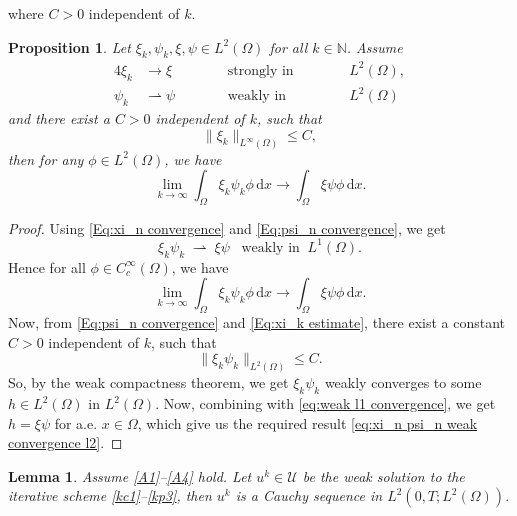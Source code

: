 \documentclass[11pt]{article}
\newtheorem{proposition}{Proposition}
\newtheorem{lemma}{Lemma}
\newcommand{\di}[1]{\,\mathrm{d}#1}
\begin{document}
where $C>0$ independent of $k$.
\begin{proposition}\label{lemma:productofsequence}
    Let $\xi_k,\psi_k,\xi,\psi\in L^2(\Omega)$ for all $k\in \mathbb{N}$. Assume 
    \begin{alignat}{4}
        \xi_k&\rightarrow\xi\hspace{1cm}&& \mbox{strongly in} \hspace{1cm}&&L^2(\Omega),\label{Eq:xi_n convergence}\\
        \psi_k&\rightharpoonup\psi&& \mbox{weakly in} &&L^2(\Omega)\label{Eq:psi_n convergence}
    \end{alignat}
    and there exist a $C>0$ independent of $k$, such that 
    \begin{equation}\label{Eq:xi_k estimate}
        \|\xi_k\|_{L^{\infty}(\Omega)}\leq C,
    \end{equation}
    then for any $\phi\in L^2(\Omega)$, we have
    \begin{equation}\label{eq:xi_n psi_n weak convergence l2}
    \lim_{k\rightarrow\infty}\int_{\Omega}\xi_k\psi_k\phi \di{x}\rightarrow \int_{\Omega}\xi\psi\phi \di{x}.
    \end{equation}
\end{proposition}
\begin{proof}
    Using \eqref{Eq:xi_n convergence} and \eqref{Eq:psi_n convergence}, we get 
    \begin{equation*}
        \xi_k\psi_k\;\rightharpoonup\;\xi\psi \;\;\;\mbox{weakly in}\;\; L^1(\Omega).
    \end{equation*}
    Hence for all $\phi\in C_c^\infty({\Omega})$, we have
     \begin{equation}\label{eq:weak l1 convergence}    \lim_{k\rightarrow\infty}\int_{\Omega}\xi_k\psi_k\phi \di{x}\rightarrow \int_{\Omega}\xi\psi\phi \di{x}.
    \end{equation}
    Now, from \eqref{Eq:psi_n convergence} and \eqref{Eq:xi_k estimate}, there exist a constant $C>0$ independent  of $k$, such that
    \begin{equation}
        \|\xi_k\psi_k\|_{L^2(\Omega)}\leq C.
    \end{equation}
    So, by the weak compactness theorem, we get $\xi_k\psi_k$ weakly converges to some $h\in L^2(\Omega)$ in $L^2(\Omega)$. Now, combining with \eqref{eq:weak l1 convergence}, we get $h=\xi\psi$ for a.e. $x\in \Omega$, which give us the required result \eqref{eq:xi_n psi_n weak convergence l2}.
\end{proof}
%
\begin{lemma}\label{lemma:cauchy}
     Assume \ref{A1}--\ref{A4} hold.    
  Let $u^{k}\in \mathcal{U}$ be the weak solution to the iterative scheme \eqref{kc1}--\eqref{kp3}, then $u^k $ is a Cauchy sequence in  $L^2(0,T;L^2(\Omega))$.
\end{lemma}
\end{document}
